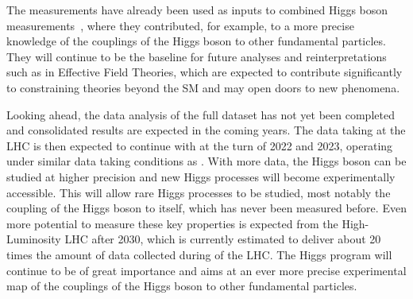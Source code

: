 The measurements have already been used as inputs to combined Higgs boson measurements~\cite{NaturePaper}, where they contributed, for example, to a more precise knowledge of the couplings of the Higgs boson to other fundamental particles. 
They will continue to be the baseline for future analyses and reinterpretations such as in Effective Field Theories, which are expected to contribute significantly to constraining theories beyond the SM and may open doors to new phenomena.

Looking ahead, the data analysis of the full \RunTwo dataset has not yet been completed and consolidated results are expected in the coming years. The data taking at the LHC is then expected to continue with \RunThr at the turn of 2022 and 2023, operating under similar data taking conditions as \RunTwo. 
With more data, the Higgs boson can be studied at higher precision and new Higgs processes will become experimentally accessible. 
This will allow rare Higgs processes to be studied, most notably the coupling of the Higgs boson to itself, which has never been measured before.
Even more potential to measure these key properties is expected from the High-Luminosity LHC after 2030, which is currently estimated to deliver about 20 times the amount of data collected during \RunTwo of the LHC. 
The Higgs program will continue to be of great importance and aims at an ever more precise experimental map of the couplings of the Higgs boson to other fundamental particles. 
